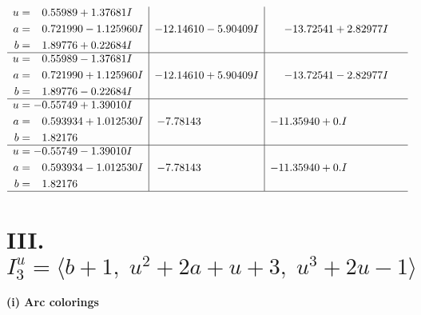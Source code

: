 \documentclass[1p]{elsarticle_modified}
\theoremstyle{definition}
\begin{document}
$$\begin{array}{c|c|c}
\begin{aligned}
u &= \phantom{-}0.55989 + 1.37681 I \\
a &= \phantom{-}0.721990 - 1.125960 I \\
b &= \phantom{-}1.89776 + 0.22684 I\end{aligned}
 & -12.14610 - 5.90409 I & -13.72541 + 2.82977 I \\ \hline\begin{aligned}
u &= \phantom{-}0.55989 - 1.37681 I \\
a &= \phantom{-}0.721990 + 1.125960 I \\
b &= \phantom{-}1.89776 - 0.22684 I\end{aligned}
 & -12.14610 + 5.90409 I & -13.72541 - 2.82977 I \\ \hline\begin{aligned}
u &= -0.55749 + 1.39010 I \\
a &= \phantom{-}0.593934 + 1.012530 I \\
b &= \phantom{-}1.82176\phantom{ +0.000000I}\end{aligned}
 & -7.78143\phantom{ +0.000000I} & -11.35940 + 0. I\phantom{ +0.000000I} \\ \hline\begin{aligned}
u &= -0.55749 - 1.39010 I \\
a &= \phantom{-}0.593934 - 1.012530 I \\
b &= \phantom{-}1.82176\phantom{ +0.000000I}\end{aligned}
 & -7.78143\phantom{ +0.000000I} & -11.35940 + 0. I\phantom{ +0.000000I}\\
 \hline 
 \end{array}$$\newpage\newpage\renewcommand{\arraystretch}{1}
\centering \section*{III. $I^u_{3}= \langle b+1,\;u^2+2 a+u+3,\;u^3+2 u-1 \rangle$}
\flushleft \textbf{(i) Arc colorings}\\
\end{document}
